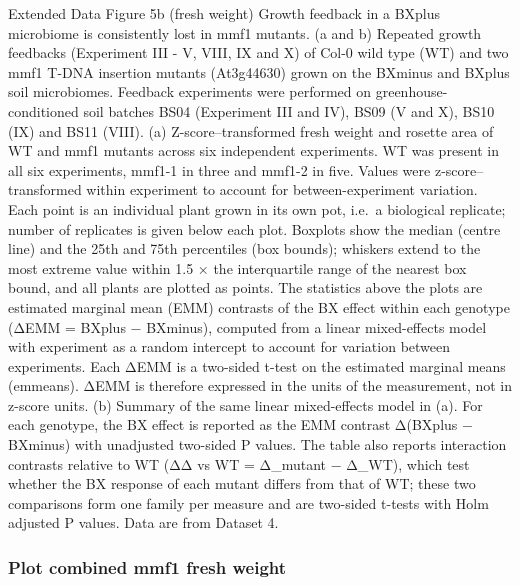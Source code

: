 \documentclass[
  10pt,
]{article}
\begin{document}
Extended Data Figure 5b (fresh weight) \textbar{} Growth feedback in a
BXplus microbiome is consistently lost in mmf1 mutants. (a and b)
Repeated growth feedbacks (Experiment III - V, VIII, IX and X) of Col-0
wild type (WT) and two mmf1 T-DNA insertion mutants (At3g44630) grown on
the BXminus and BXplus soil microbiomes. Feedback experiments were
performed on greenhouse-conditioned soil batches BS04 (Experiment III
and IV), BS09 (V and X), BS10 (IX) and BS11 (VIII). (a)
Z-score--transformed fresh weight and rosette area of WT and mmf1
mutants across six independent experiments. WT was present in all six
experiments, mmf1-1 in three and mmf1-2 in five. Values were
z-score--transformed within experiment to account for between-experiment
variation. Each point is an individual plant grown in its own pot,
i.e.~a biological replicate; number of replicates is given below each
plot. Boxplots show the median (centre line) and the 25th and 75th
percentiles (box bounds); whiskers extend to the most extreme value
within 1.5 × the interquartile range of the nearest box bound, and all
plants are plotted as points. The statistics above the plots are
estimated marginal mean (EMM) contrasts of the BX effect within each
genotype (ΔEMM = BXplus − BXminus), computed from a linear mixed-effects
model with experiment as a random intercept to account for variation
between experiments. Each ΔEMM is a two-sided t-test on the estimated
marginal means (emmeans). ΔEMM is therefore expressed in the units of
the measurement, not in z-score units. (b) Summary of the same linear
mixed-effects model in (a). For each genotype, the BX effect is reported
as the EMM contrast Δ(BXplus − BXminus) with unadjusted two-sided P
values. The table also reports interaction contrasts relative to WT (ΔΔ
vs WT = Δ\_mutant − Δ\_WT), which test whether the BX response of each
mutant differs from that of WT; these two comparisons form one family
per measure and are two-sided t-tests with Holm adjusted P values. Data
are from Dataset 4.

\subsubsection{\texorpdfstring{\textbf{Plot combined mmf1 fresh
weight}}{Plot combined mmf1 fresh weight}}\label{plot-combined-mmf1-fresh-weight}
\end{document}
